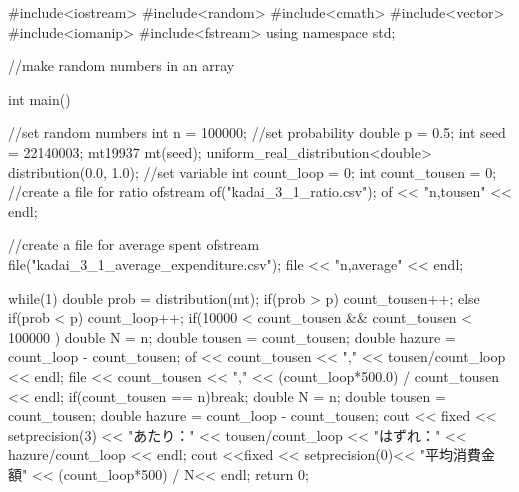 \documentclass[fleqn, a4paper. 12pt]{ltjsarticle} %
\begin{document}
\begin{cppcode}
  #include<iostream>
#include<random>
#include<cmath>
#include<vector>
#include<iomanip>
#include<fstream>
using namespace std;

//make random numbers in an array


int main(){
    //set random numbers
    int n = 100000;
    //set probability
    double p = 0.5;
    int seed = 22140003;
    mt19937 mt(seed);
    uniform_real_distribution<double> distribution(0.0, 1.0);
    //set variable
    int count_loop = 0;
    int count_tousen = 0;
    //create a file for ratio
    ofstream of("kadai_3_1_ratio.csv");
    of << "n,tousen" << endl;

    //create a file for  average spent
    ofstream file("kadai_3_1_average_expenditure.csv");
    file << "n,average" << endl;


    while(1){
        double prob = distribution(mt);
        if(prob > p){
            count_tousen++;
        }
        else if(prob < p){
        }
        count_loop++;
        if(10000 < count_tousen && count_tousen < 100000 ){
            double N = n;
            double tousen = count_tousen;
            double hazure = count_loop - count_tousen;
            of << count_tousen << "," << tousen/count_loop << endl; 
            file << count_tousen << "," << (count_loop*500.0) / count_tousen << endl;
        }
        if(count_tousen == n)break;
    }
    double N = n;
    double tousen = count_tousen;
    double hazure = count_loop - count_tousen;
    cout << fixed << setprecision(3) <<  "あたり：" << tousen/count_loop << "はずれ：" << hazure/count_loop << endl;
    cout <<fixed << setprecision(0)<< "平均消費金額" << (count_loop*500) / N<< endl;
    return 0;
}
\end{cppcode}
\end{document}
